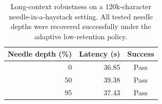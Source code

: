 \begin{table}[htbp]
\centering
\caption{Long-context robustness on a 120k-character needle-in-a-haystack setting. All tested needle depths were recovered successfully under the adaptive low-retention policy.}
\label{tab:long-context-robustness}
\small
\setlength{\tabcolsep}{5pt}
\begin{tabular}{r r c}
\hline
Needle depth (\%) & Latency (s) & Success \\
\hline
0 & 36.85 & Pass \\
50 & 39.38 & Pass \\
95 & 37.43 & Pass \\
\hline
\end{tabular}
\end{table}
